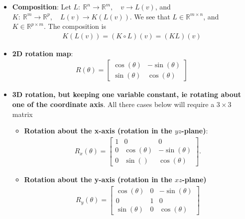 \documentclass{report}
\begin{document}
    \pagebreak 
    \begin{itemize}
        \item \textbf{Composition}: Let $L:\ \mathbb{R}^{n} \to \mathbb{R}^{m},\quad v \to L(v)$, and $K:\ \mathbb{R}^{m} \to \mathbb{R}^{p},\quad L(v) \to K(L(v))$. We see that $L \in\mathbb{R}^{m\times n} $, and $K \in \mathbb{R}^{p\times m}$.
            \bigbreak \noindent 
            The composition is 
            \begin{align*}
                K(L(v)) = (K \circ L)(v) = (KL)(v)
            \end{align*}
        \item \textbf{2D rotation map}: 
            \begin{align*}
                R(\theta ) = \begin{bmatrix} \cos{\left(\theta \right)}  & -\sin{\left(\theta \right)} \\ \sin{\left(\theta \right)} & \cos{\left(\theta \right)} \end{bmatrix}
            \end{align*}
        \item \textbf{3D rotation, but keeping one variable constant, ie rotating about one of the coordinate axis}. 
            \bigbreak \noindent 
            All there cases below will require a $3\times 3$ matrix
            \begin{itemize}
                \item \textbf{Rotation about the x-axis (rotation in the $yz$-plane)}: 
                    \begin{align*}
                        R_{x}(\theta ) =  \begin{bmatrix} 1 & 0 & 0 \\ 0 & \cos{\left(\theta \right)} & -\sin{\left(\theta \right)} \\ 0 & \sin{\left(\right)} & \cos{\left(\theta \right)}\end{bmatrix}
                    .\end{align*}
                \item \textbf{Rotation about the y-axis (rotation in the $xz$-plane)}
                    \begin{align*}
                        R_{y}(\theta ) = \begin{bmatrix} \cos{\left(\theta   \right)} & 0 & -\sin{\left(\theta \right)} \\ 0 & 1 & 0 \\ \sin{\left(\theta \right)} & 0 & \cos{\left(\theta \right)}\end{bmatrix}

\end{align*}
\end{itemize}
\end{itemize}
\end{document}
